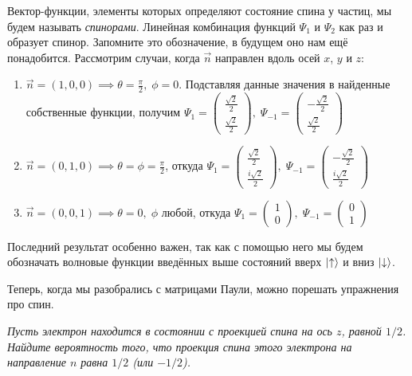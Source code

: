 Вектор-функции, элементы которых определяют состояние спина у частиц, мы будем называть \textit{спинорами}. Линейная комбинация функций $\Psi_1$ и $\Psi_2$ как раз и образует спинор. Запомните это обозначение, в будущем оно нам ещё понадобится.
Рассмотрим случаи, когда $\Vec{n}$ направлен вдоль осей $x$, $y$ и $z$:
\begin{enumerate}
    \item $\Vec{n} = (1, 0, 0) \implies \theta = \frac{\pi}{2}, \; \phi = 0.$ Подставляя данные значения в найденные собственные функции, получим $\Psi_1 = \begin{pmatrix}\frac{\sqrt{2}}{2} \\ \frac{\sqrt{2}}{2}\end{pmatrix}, \; \Psi_{-1} = \begin{pmatrix} -\frac{\sqrt{2}}{2} \\ \frac{\sqrt{2}}{2}\end{pmatrix}$
    \item $\Vec{n} = (0, 1, 0) \implies \theta = \phi = \frac{\pi}{2}$, откуда $\Psi_1 = \begin{pmatrix} \frac{\sqrt{2}}{2} \\ \frac{i\sqrt{2}}{2} \end{pmatrix}, \; \Psi_{-1} = \begin{pmatrix} -\frac{\sqrt{2}}{2} \\ \frac{i\sqrt{2}}{2} \end{pmatrix}$
    \item $\Vec{n} = (0, 0, 1) \implies \theta = 0, \; \phi$ любой, откуда $\Psi_1 = \begin{pmatrix} 1 \\ 0 \end{pmatrix}, \;
    \Psi_{-1} = \begin{pmatrix} 0 \\ 1 \end{pmatrix}$ 
\end{enumerate}
Последний результат особенно важен, так как с помощью него мы будем обозначать волновые функции введённых выше состояний вверх $\ket{\uparrow}$ и вниз $\ket{\downarrow}$.

Теперь, когда мы разобрались с матрицами Паули, можно порешать упражнения про спин.
\begin{center}
    \textit{Пусть электрон находится в состоянии с проекцией спина на ось $z$, равной $1/2$. Найдите вероятность того, что проекция спина этого электрона на направление $n$ равна $1/2$ (или $-1/2$).}
\end{center}

